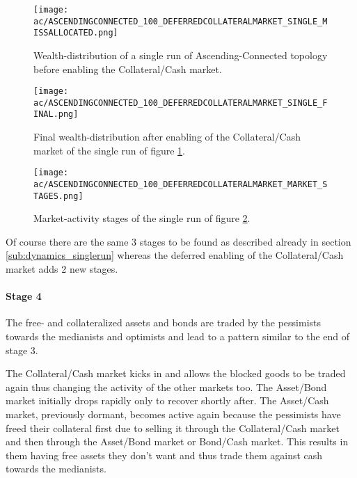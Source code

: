 \documentclass[Bachelorarbeit.tex]{subfiles}
\begin{document}
\medskip

\begin{figure}[H]
	\centering
  \texttt{[image: ac/ASCENDINGCONNECTED\_100\_DEFERREDCOLLATERALMARKET\_SINGLE\_MISSALLOCATED.png]}
  	\caption{Wealth-distribution of a single run of Ascending-Connected topology before enabling the Collateral/Cash market.}
	\label{fig:wealth_ASCENDINGCONNECTED_100_DEFERREDCOLLATERALMARKET_SINGLE_MISSALLOCATED}
\end{figure}

\begin{figure}[H]
	\centering
  \texttt{[image: ac/ASCENDINGCONNECTED\_100\_DEFERREDCOLLATERALMARKET\_SINGLE\_FINAL.png]}
  	\caption{Final wealth-distribution after enabling of the Collateral/Cash market of the single run of figure \ref{fig:wealth_ASCENDINGCONNECTED_100_DEFERREDCOLLATERALMARKET_SINGLE_MISSALLOCATED}.}
	\label{fig:wealth_ASCENDINGCONNECTED_100_DEFERREDCOLLATERALMARKET_SINGLE_FINAL}
\end{figure}

\begin{figure}[H]
	\centering
  \texttt{[image: ac/ASCENDINGCONNECTED\_100\_DEFERREDCOLLATERALMARKET\_MARKET\_STAGES.png]}
  	\caption{Market-activity stages of the single run of figure \ref{fig:wealth_ASCENDINGCONNECTED_100_DEFERREDCOLLATERALMARKET_SINGLE_FINAL}.}
	\label{fig:markets_ASCENDINGCONNECTED_100_DEFERREDCOLLATERALMARKET_MARKET_STAGES}
\end{figure}

Of course there are the same 3 stages to be found as described already in section \ref{sub:dynamics_singlerun} whereas the deferred enabling of the Collateral/Cash market adds 2 new stages.

\paragraph{Stage 4}
The free- and collateralized assets and bonds are traded by the pessimists towards the medianists and optimists and lead to a pattern similar to the end of stage 3.

\medskip

The Collateral/Cash market kicks in and allows the blocked goods to be traded again thus changing the activity of the other markets too. The Asset/Bond market initially drops rapidly only to recover shortly after. The Asset/Cash market, previously dormant, becomes active again because the pessimists have freed their collateral first due to selling it through the Collateral/Cash market and then through the Asset/Bond market or Bond/Cash market. This results in them having free assets they don't want and thus trade them against cash towards the medianists.
\end{document}
